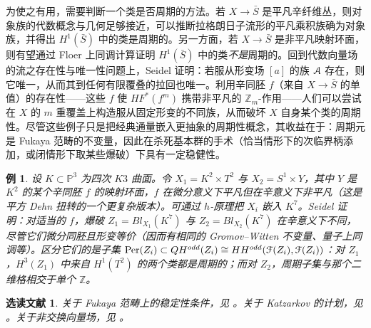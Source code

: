 \documentclass[11pt,a4paper]{article}
\numberwithin{equation}{section}
\newtheorem{Example}[thm]{例}
\newtheorem*{Notes}{选读文献}
\newcommand{\bZ}{\mathbb{Z}}
\newcommand{\bP}{\mathbb{P}}
\newcommand{\scrA}{\EuScript{A}}
\newcommand{\scrF}{\EuScript{F}}
\newcommand{\CC}{\mathcal{C}}
\begin{document}
为使之有用，需要判断一个类是否周期的方法。若 $X \rightarrow \bar{S}$ 是平凡辛纤维丛，则对象族的代数概念与几何足够接近，可以推断拉格朗日子流形的平凡乘积族确为对象族，并得出 $H^1(\bar{S})$ 中的类是周期的。另一方面，若 $X\rightarrow \bar{S}$ 是非平凡映射环面，则有望通过 Floer 上同调计算证明 $H^1(\bar{S})$ 中的类\emph{不是}周期的。回到代数向量场的流之存在性与唯一性问题上，Seidel 证明：若服从形变场 $[a]$ 的族 $\scrA$ 存在，则它唯一，从而其到任何有限覆叠的拉回也唯一。利用辛同胚 $f$（来自 $X\rightarrow \bar{S}$ 的单值）的存在性——这些 $f$ 使 $HF^*(f^m)$ 携带非平凡的 $\bZ_m$-作用——人们可以尝试在 $X$ 的 $m$ 重覆盖上构造服从固定形变的不同族，从而破坏 $X$ 自身某个类的周期性。尽管这些例子只是把经典通量嵌入更抽象的周期性概念，其收益在于：周期元是 Fukaya 范畴的不变量，因此在杀死基本群的手术（恰当情形下的次临界柄添加，或闭情形下取某些爆破）下具有一定稳健性。


\begin{Example} 设 $K \subset \bP^3$ 为四次 $K3$ 曲面。令 $X_1 = K^2 \times T^2$ 与 $X_2 = S^1 \times Y$，其中 $Y$ 是 $K^2$ 的某个辛同胚 $f$ 的映射环面，$f$ 在微分意义下平凡但在辛意义下非平凡（这是平方 Dehn 扭转的一个更复杂版本）。可通过 $h$-原理把 $X_i$ 嵌入 $K^7$。Seidel \cite{Seidel:Flux} 证明：对适当的 $f$，爆破 $Z_1 = Bl_{X_1}(K^7)$ 与 $Z_2 = Bl_{X_2}(K^7)$ 在辛意义下不同，尽管它们微分同胚且形变等价（因而有相同的 Gromov--Witten 不变量、量子上同调等）。区分它们的是子集 $\mathrm{Per}(Z_i) \subset QH^{odd}(Z_i) \cong HH^{odd}(\scrF(Z_i),\scrF(Z_i))$：对 $Z_1$，$H^3(Z_1)$ 中来自 $H^1(T^2)$ 的两个类都是周期的；而对 $Z_2$，周期子集与那个二维格相交于单个 $\bZ$。
\end{Example}


\begin{Notes}
关于 Fukaya 范畴上的稳定性条件，见 \cite{KS, Smith:quiver, Thomas:braid}。关于 Katzarkov 的计划，见 \cite{BallardEtAl,KatzarkovKerr, Katzarkov}。关于非交换向量场，见 \cite{Seidel-Solomon, Seidel:Flux, AbouzaidSmith:arc}。
\end{Notes}
\end{document}

